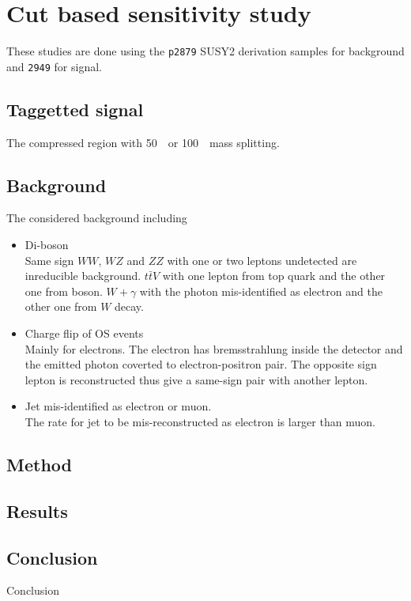 \clearpage
\section{Cut based sensitivity study}
These studies are done using the \verb+p2879+ SUSY2 derivation samples for background and \verb+2949+ for signal.

\subsection{Taggetted signal}
The compressed region with 50~\GeV\ or 100~\GeV\ mass splitting.

\subsection{Background}
The considered background including
\begin{itemize}
  \item Di-boson\\
    Same sign $WW$, $WZ$ and $ZZ$ with one or two leptons undetected are inreducible background. $t\bar{t}V$ with one lepton from top quark and the other one from boson. $W+\gamma$ with the photon mis-identified as electron and the other one from $W$ decay.
  \item Charge flip of OS events\\
    Mainly for electrons. The electron has bremsstrahlung inside the detector and the emitted photon coverted to electron-positron pair. The opposite sign lepton is reconstructed thus give a same-sign pair with another lepton.
  \item Jet mis-identified as electron or muon.\\
    The rate for jet to be mis-reconstructed as electron is larger than muon.
\end{itemize}

\subsection{Method}

\subsection{Results}

\subsection{Conclusion}
Conclusion
